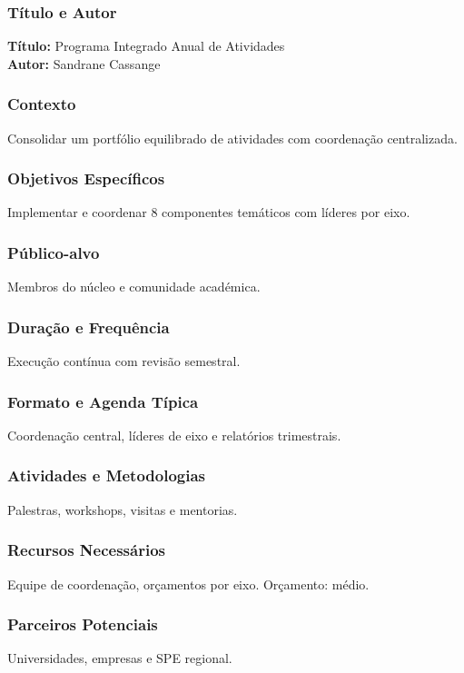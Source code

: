 \documentclass[12pt,a4paper]{article}
\begin{document}
\subsubsection*{Título e Autor}
\textbf{Título:} Programa Integrado Anual de Atividades \\
\textbf{Autor:} Sandrane Cassange

\subsubsection*{Contexto}
Consolidar um portfólio equilibrado de atividades com coordenação centralizada.

\subsubsection*{Objetivos Específicos}
Implementar e coordenar 8 componentes temáticos com líderes por eixo.

\subsubsection*{Público-alvo}
Membros do núcleo e comunidade académica.

\subsubsection*{Duração e Frequência}
Execução contínua com revisão semestral.

\subsubsection*{Formato e Agenda Típica}
Coordenação central, líderes de eixo e relatórios trimestrais.

\subsubsection*{Atividades e Metodologias}
Palestras, workshops, visitas e mentorias.

\subsubsection*{Recursos Necessários}
Equipe de coordenação, orçamentos por eixo. Orçamento: médio.

\subsubsection*{Parceiros Potenciais}
Universidades, empresas e SPE regional.
\end{document}
